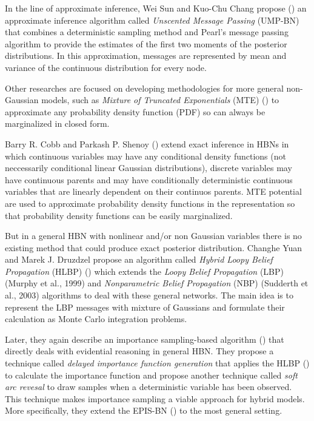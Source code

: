 \documentclass[a4paper,11pt]{article}
\begin{document}
In the line of approximate inference, Wei Sun and Kuo-Chu Chang propose (\cite{ump-bn2007}) an approximate inference algorithm called \textit{Unscented Message Passing} (UMP-BN)  that combines a deterministic sampling method and Pearl's message passing algorithm to provide the estimates of the first two moments of the posterior distributions. In this approximation, messages are represented by mean and variance of the continuous distribution for every node. 

Other researches are focused on developing methodologies for more general non-Gaussian models, such as \textit{Mixture of Truncated Exponentials} (MTE) (\cite{cobbshenoy2005}) to approximate any probability density function (PDF) so can always be marginalized in closed form.

Barry R. Cobb and Parkash P. Shenoy (\cite{cobbshenoyLinear2005}) extend exact inference in HBNs in which continuous variables may have any conditional density functions (not neccessarily conditional linear Gaussian distributions), discrete variables may have continuous parents and may have conditionally deterministic continuous variables that are linearly dependent on their continuos parents. MTE potential are used to approximate probability density functions in the representation so that probability density functions can be easily marginalized.

But in a general HBN with nonlinear and/or non Gaussian variables there is no existing method that could produce exact posterior distribution. Changhe Yuan and Marek J. Druzdzel propose an algorithm called \textit{Hybrid Loopy Belief Propagation} (HLBP) (\cite{yuandruzdzelloopy2006}) which extends the \textit{Loopy Belief Propagation} (LBP) (Murphy et al., 1999) and \textit{Nonparametric Belief Propagation} (NBP) (Sudderth et al., 2003) algorithms to deal with these general networks. The main idea is to represent the LBP messages with mixture of Gaussians and formulate their calculation as Monte Carlo integration problems. 

Later, they again describe an importance sampling-based algorithm (\cite{yuanmarek2007}) that directly deals with evidential reasoning in general HBN. They propose a technique called \textit{delayed importance function generation} that applies the HLBP (\cite{yuandruzdzelloopy2006}) to calculate the importance function and propose another technique called \textit{soft arc revesal} to draw samples when a deterministic variable has been observed. This technique makes importance sampling a viable approach for hybrid models. More specifically, they extend the EPIS-BN (\cite{yuandruzdzel2006}) to the most general setting. 
\end{document}
